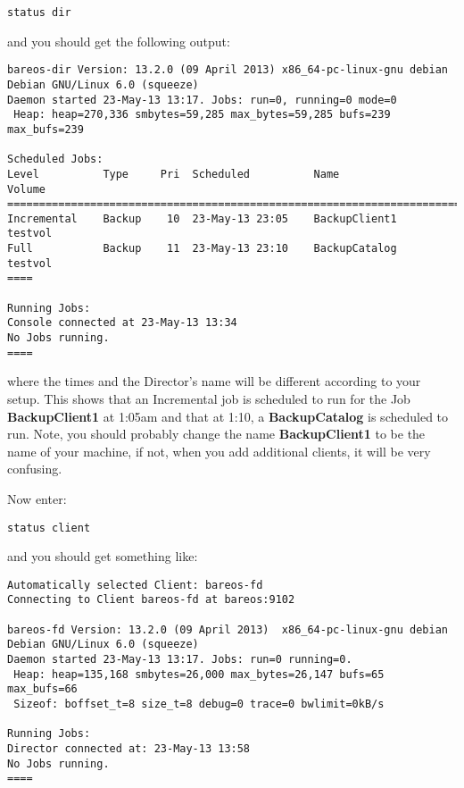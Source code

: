 \footnotesize
\begin{verbatim}
status dir
\end{verbatim}
\normalsize

and you should get the following output:

\footnotesize
\begin{verbatim}
bareos-dir Version: 13.2.0 (09 April 2013) x86_64-pc-linux-gnu debian Debian GNU/Linux 6.0 (squeeze)
Daemon started 23-May-13 13:17. Jobs: run=0, running=0 mode=0
 Heap: heap=270,336 smbytes=59,285 max_bytes=59,285 bufs=239 max_bufs=239

Scheduled Jobs:
Level          Type     Pri  Scheduled          Name               Volume
===================================================================================
Incremental    Backup    10  23-May-13 23:05    BackupClient1      testvol
Full           Backup    11  23-May-13 23:10    BackupCatalog      testvol
====

Running Jobs:
Console connected at 23-May-13 13:34
No Jobs running.
====
\end{verbatim}
\normalsize

where the times and the Director's name will be different according to your
setup. This shows that an Incremental job is scheduled to run for the Job {\bf
BackupClient1} at 1:05am and that at 1:10, a {\bf BackupCatalog} is scheduled to
run. Note, you should probably change the name {\bf BackupClient1} to be the name of
your machine, if not, when you add additional clients, it will be very
confusing.

Now enter:

\footnotesize
\begin{verbatim}
status client
\end{verbatim}
\normalsize

and you should get something like:

\footnotesize
\begin{verbatim}
Automatically selected Client: bareos-fd
Connecting to Client bareos-fd at bareos:9102

bareos-fd Version: 13.2.0 (09 April 2013)  x86_64-pc-linux-gnu debian Debian GNU/Linux 6.0 (squeeze)
Daemon started 23-May-13 13:17. Jobs: run=0 running=0.
 Heap: heap=135,168 smbytes=26,000 max_bytes=26,147 bufs=65 max_bufs=66
 Sizeof: boffset_t=8 size_t=8 debug=0 trace=0 bwlimit=0kB/s

Running Jobs:
Director connected at: 23-May-13 13:58
No Jobs running.
====
\end{verbatim}
\normalsize

